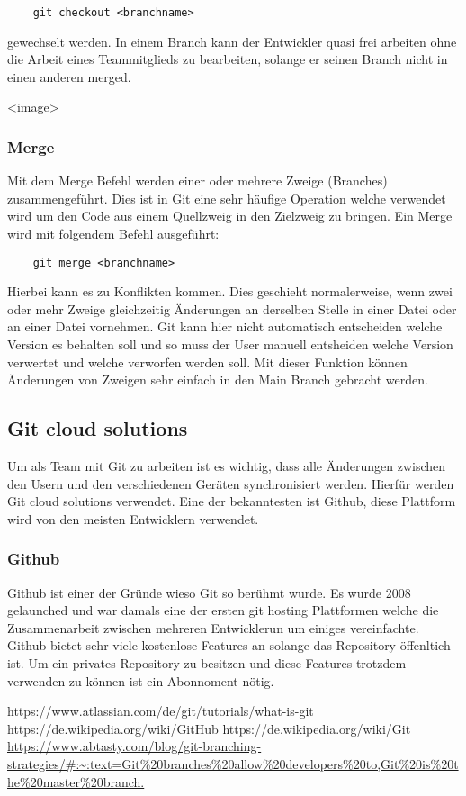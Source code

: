 \begin{verbatim}
    git checkout <branchname>
\end{verbatim}

gewechselt werden.
In einem Branch kann der Entwickler quasi frei arbeiten ohne die Arbeit eines Teammitglieds zu bearbeiten, solange er seinen Branch nicht in einen anderen merged.

<image>

\subsubsection{Merge}

Mit dem Merge Befehl werden einer oder mehrere Zweige (Branches) zusammengeführt. Dies ist in Git eine sehr häufige Operation welche verwendet wird um den Code aus einem Quellzweig in den Zielzweig zu bringen.
Ein Merge wird mit folgendem Befehl ausgeführt: 

\begin{verbatim}
    git merge <branchname>
\end{verbatim}

Hierbei kann es zu Konflikten kommen. Dies geschieht normalerweise, wenn zwei oder mehr Zweige gleichzeitig Änderungen an derselben Stelle in einer Datei oder an einer Datei vornehmen. Git kann hier nicht automatisch entscheiden welche Version es behalten soll und so muss der User manuell entsheiden welche Version verwertet und welche verworfen werden soll. Mit dieser Funktion können Änderungen von Zweigen sehr einfach in den Main Branch gebracht werden.

\subsection{Git cloud solutions}

Um als Team mit Git zu arbeiten ist es wichtig, dass alle Änderungen zwischen den Usern und den verschiedenen Geräten synchronisiert werden. Hierfür werden Git cloud solutions verwendet. Eine der bekanntesten ist Github, diese Plattform wird von den meisten Entwicklern verwendet.

\subsubsection{Github}

Github ist einer der Gründe wieso Git so berühmt wurde. Es wurde 2008 gelaunched und war damals eine der ersten git hosting Plattformen welche die Zusammenarbeit zwischen mehreren Entwicklerun um einiges vereinfachte. Github bietet sehr viele kostenlose Features an solange das Repository öffenltich ist. Um ein privates Repository zu besitzen und diese Features trotzdem verwenden zu können ist ein Abonnoment nötig.


https://www.atlassian.com/de/git/tutorials/what-is-git
https://de.wikipedia.org/wiki/GitHub
https://de.wikipedia.org/wiki/Git
\url{https://www.abtasty.com/blog/git-branching-strategies/#:~:text=Git%20branches%20allow%20developers%20to,Git%20is%20the%20master%20branch.}